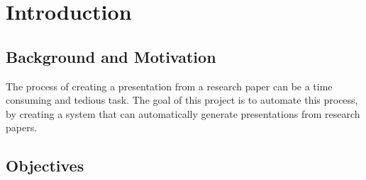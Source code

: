 
\chapter{Introduction}
\label{ch:intro}


\section{Background and Motivation}
\label{sec:intro:background}


The process of creating a presentation from a research paper can be a time consuming and tedious task. The goal of this project is to automate this process, by creating a system that can automatically generate presentations from research papers.

\section{Objectives}
\label{sec:intro:objectives}


